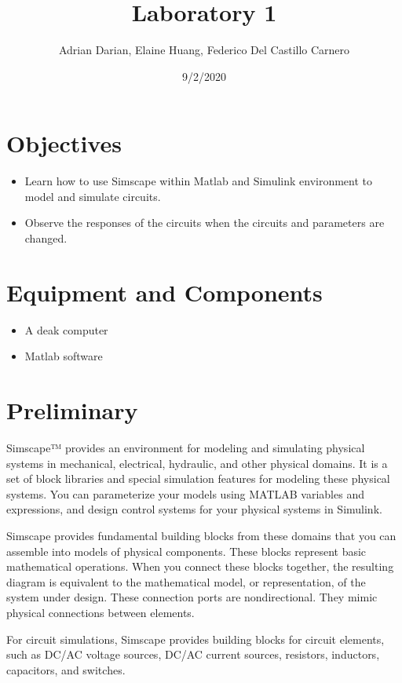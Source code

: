 \documentclass[a4paper]{article}
\title{Laboratory 1}
\author{Adrian Darian, Elaine Huang, Federico Del Castillo Carnero}
\date{9/2/2020}
\begin{document}
  
\maketitle
  
\section*{Objectives}
\begin{itemize}
	\item Learn how to use Simscape within Matlab and Simulink environment to model and simulate circuits.
	\item Observe the responses of the circuits when the circuits and parameters are changed.
\end{itemize}

\section*{Equipment and Components}
\begin{itemize}
	\item A deak computer
	\item Matlab software
\end{itemize}

\section*{Preliminary}
Simscape™ provides an environment for modeling and simulating physical systems in mechanical, electrical, hydraulic, and other physical domains. It is a set of block libraries and special simulation features for modeling these physical systems.  You can parameterize your models using MATLAB variables and expressions, and design control systems for your physical systems in Simulink. 
  
Simscape provides fundamental building blocks from these domains that you can assemble into models of physical components.  These blocks represent basic mathematical operations. When you connect these blocks together, the resulting diagram is equivalent to the mathematical model, or representation, of the system under design. These connection ports are nondirectional. They mimic physical connections between elements.
  
For circuit simulations, Simscape provides building blocks for circuit elements, such as DC/AC voltage sources, DC/AC current sources, resistors, inductors, capacitors, and switches.
  
\end{document}
